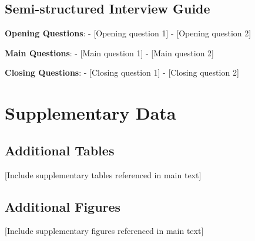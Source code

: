 \documentclass[
  12pt,
  letterpaper,
  12pt,
  letterpaper,
  oneside]{report}
\begin{document}

\subsection*{Semi-structured Interview
Guide}\label{semi-structured-interview-guide}

\textbf{Opening Questions}: - {[}Opening question 1{]} - {[}Opening
question 2{]}

\textbf{Main Questions}: - {[}Main question 1{]} - {[}Main question 2{]}

\textbf{Closing Questions}: - {[}Closing question 1{]} - {[}Closing
question 2{]}

\section*{Supplementary Data}\label{supplementary-data}


\subsection*{Additional Tables}\label{additional-tables}

{[}Include supplementary tables referenced in main text{]}

\subsection*{Additional Figures}\label{additional-figures}

{[}Include supplementary figures referenced in main text{]}
\end{document}
